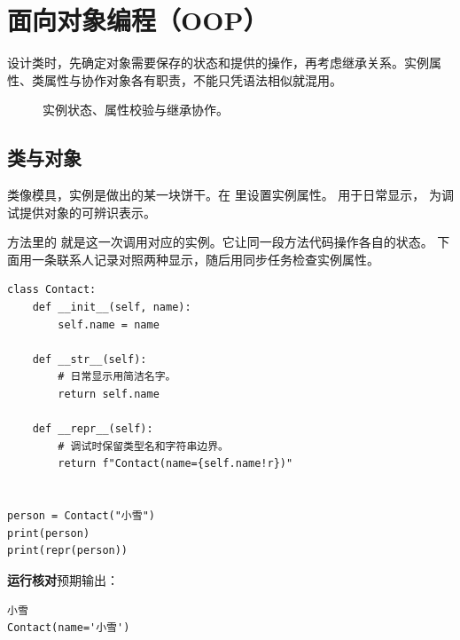 \chapter[面向对象编程]{面向对象编程（OOP）}
\label{ch:05-outline}

设计类时，先确定对象需要保存的状态和提供的操作，再考虑继承关系。实例属性、类属性与协作对象各有职责，不能只凭语法相似就混用。


\begin{figure}[htbp]
  \centering
  \caption*{实例状态、属性校验与继承协作。}
\end{figure}


\section{类与对象}

类像模具，实例是做出的某一块饼干。在  里设置实例属性。
 用于日常显示， 为调试提供对象的可辨识表示。

方法里的  就是这一次调用对应的实例。它让同一段方法代码操作各自的状态。
下面用一条联系人记录对照两种显示，随后用同步任务检查实例属性。


\begin{lstlisting}[title={\code{contact_repr.py}}]
class Contact:
    def __init__(self, name):
        self.name = name

    def __str__(self):
        # 日常显示用简洁名字。
        return self.name

    def __repr__(self):
        # 调试时保留类型名和字符串边界。
        return f"Contact(name={self.name!r})"


person = Contact("小雪")
print(person)
print(repr(person))
\end{lstlisting}


\textbf{运行核对}\enspace 预期输出：
\begin{lstlisting}[language={},numbers=none]
小雪
Contact(name='小雪')
\end{lstlisting}

